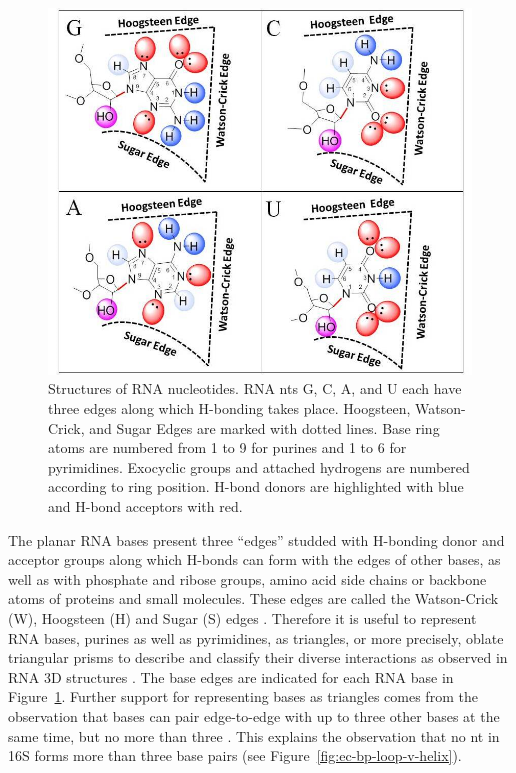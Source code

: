 \begin{figure}[p]
  \includegraphics[width=\linewidth]{chapter-1/figs/bases}
  \caption{Structures of RNA nucleotides. RNA nts G, C, A, and U each have three
    edges along which H-bonding takes place. Hoogsteen, Watson-Crick, and Sugar
    Edges are marked with dotted lines. Base ring atoms are numbered from 1 to 9
    for purines and 1 to 6 for pyrimidines. Exocyclic groups and attached
    hydrogens are numbered according to ring position. H-bond donors are
  highlighted with blue and H-bond acceptors with red.}
  \label{fig:bases}
\end{figure}

The planar RNA bases present three ``edges'' studded with H-bonding donor and 
acceptor groups along which H-bonds can form with the edges of other bases, as
well as with phosphate and ribose groups, amino acid side chains or backbone
atoms of proteins and small molecules. These edges are called the Watson-Crick
(W), Hoogsteen (H) and Sugar (S) edges \cite{Leontis2001}. Therefore it is
useful to represent RNA bases, purines as well as pyrimidines, as triangles, or
more precisely, oblate triangular prisms to describe and classify their diverse
interactions as observed in RNA 3D structures \cite{Hoehndorf2011}. The base
edges are indicated for each RNA base in Figure~\ref{fig:bases}. Further support for
representing bases as triangles comes from the observation that bases can pair
edge-to-edge with up to three other bases at the same time, but no more than
three \cite{AbuAlmakarem2012b}. This explains the observation that no nt in 16S
forms more than three base pairs (see Figure~\ref{fig:ec-bp-loop-v-helix}). 

